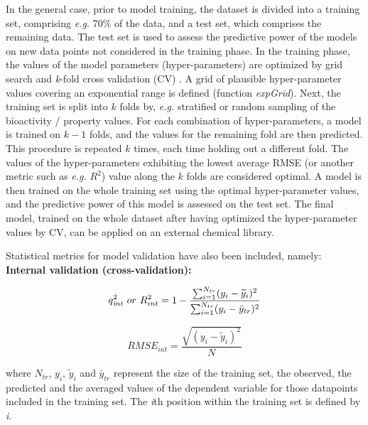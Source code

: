\documentclass[twoside,a4wide,10pt]{article}
\begin{document}
In the general case, prior to model training, the dataset is divided into a training set,
comprising {\it e.g.} 70\% of the data, and 
a test set, which comprises the remaining data.
The test set is used to assess the predictive power of the models on new data points
not considered in the training phase.
In the training phase, the values of the model parameters (hyper-parameters) are optimized by grid search and {\it k}-fold cross validation (CV) \citep{overfitting}.
A grid of plausible hyper-parameter values covering an exponential range is defined (function {\it expGrid}).
Next, the training set is split into $k$ folds by, {\it e.g.} stratified or random sampling of the bioactivity / property values.
For each combination of hyper-parameters, 
a model is trained on $k-1$ folds, and the values for the remaining fold are then predicted. 
This procedure is repeated $k$ times, each time holding out a different fold. 
The values of the hyper-parameters exhibiting the lowest average RMSE (or another metric such as {\it e.g.} $R^2$)
value along the $k$ folds are considered optimal. 
A model is then trained on the whole training set using the optimal hyper-parameter values,
and the predictive power of this model is assessed on the test set. 
The final model, trained on the whole dataset after having optimized the hyper-parameter values by CV,
can be applied on an external chemical library.

Statistical metrics for model validation have also been included, namely:\\

{\bf Internal validation (cross-validation):}

\begin{equation}
q_{{\it int}}^{2} \ or \  R_{int}^{2}  = 1 - \frac {\sum_{i=1}^{N_{tr}} (y_{i} - \widetilde{y}_{i})^{2}} {\sum_{i=1}^{N_{tr}} (y_{i} - \bar{y}_{tr})^{2}}
\end{equation}

\begin{equation}
RMSE_{int} = \frac {\sqrt {(y_i - \widetilde{y}_i)^{2}}} {N}
\end{equation}

where $N_{tr}$, $y_i$, $\widetilde{y}_i$ and $\bar{y}_{tr}$ represent the size of the training set, the observed, the predicted and the averaged values of the dependent variable for those datapoints included in the training set. 
The {\it i}th position within the training set is defined by {\it i}.\\  
\end{document}
